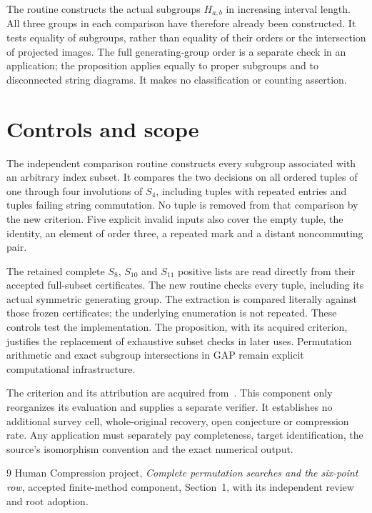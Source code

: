 \documentclass[11pt,a4paper]{article}
\begin{document}
The routine constructs the actual subgroups $H_{a,b}$ in increasing
interval length. All three groups in each comparison have therefore
already been constructed. It tests equality of subgroups, rather than
equality of their orders or the intersection of projected images.
The full generating-group order is a separate check in an application;
the proposition applies equally to proper subgroups and to disconnected
string diagrams. It makes no classification or counting assertion.

\section*{Controls and scope}
The independent comparison routine constructs every subgroup associated
with an arbitrary index subset. It compares the two decisions on all
ordered tuples of one through four involutions of $S_4$, including tuples
with repeated entries and tuples failing string commutation. No tuple
is removed from that comparison by the new criterion. Five explicit
invalid inputs also cover the empty tuple, the identity, an element of
order three, a repeated mark and a distant noncommuting pair.

The retained complete $S_8$, $S_{10}$ and $S_{11}$ positive lists are
read directly from their accepted full-subset certificates. The new
routine checks every tuple, including its actual symmetric generating
group. The extraction is compared literally against those frozen
certificates; the underlying enumeration is not repeated. These controls
test the implementation. The proposition, with its acquired criterion,
justifies the replacement of exhaustive subset checks in later uses.
Permutation arithmetic and exact subgroup intersections in GAP remain
explicit computational infrastructure.

The criterion and its attribution are acquired from~\cite{method}.
This component only reorganizes its
evaluation and supplies a separate verifier. It establishes no additional
survey cell, whole-original recovery, open conjecture or compression rate.
Any application must separately pay completeness, target identification,
the source's isomorphism convention and the exact numerical output.

\begin{thebibliography}{9}\small
{} Human Compression project, \emph{Complete permutation
searches and the six-point row}, accepted finite-method component,
Section~1, with its independent review and root adoption.
\end{thebibliography}
\end{document}
